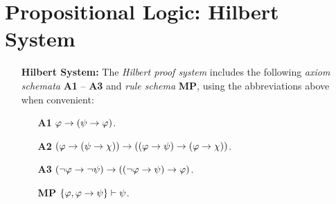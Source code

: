 \documentclass[a4paper, 11pt]{article} %
\begin{document}
\section*{\sc Propositional Logic: Hilbert System}

\begin{enumerate}[leftmargin=1.2in]
	\item[\bf Hilbert System:] The \textit{Hilbert proof system} includes the following \textit{axiom schemata} \textbf{A1} -- \textbf{A3} and \textit{rule schema} \textbf{MP}, using the abbreviations above when convenient:
	      \begin{itemize}[leftmargin=.5in]
		      \item[\bf A1] $\varphi \rightarrow (\psi \rightarrow \varphi)$.
		      \item[\bf A2] $(\varphi \rightarrow (\psi \rightarrow \chi)) \rightarrow ((\varphi \rightarrow \psi) \rightarrow (\varphi \rightarrow \chi))$.
		      \item[\bf A3] $(\neg\varphi \rightarrow \neg\psi) \rightarrow ((\neg\varphi \rightarrow \psi) \rightarrow \varphi)$.
		      \item[\bf MP] $\lbrace\varphi, \varphi \rightarrow \psi\rbrace \vdash \psi$.

\end{itemize}
\end{enumerate}
\end{document}
